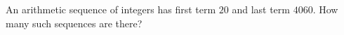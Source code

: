 An arithmetic sequence of integers has first term $20$ and last term $4060$. How many such sequences are there?
